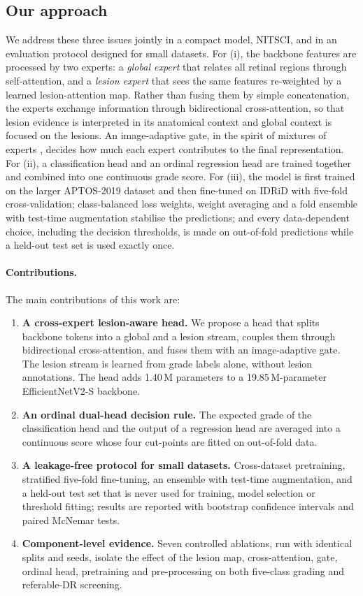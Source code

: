 \subsection*{Our approach}
We address these three issues jointly in a compact model, NITSCI, and in an evaluation protocol designed for small
datasets. For (i), the backbone features are processed by two experts: a \emph{global expert} that relates all
retinal regions through self-attention, and a \emph{lesion expert} that sees the same features re-weighted by a
learned lesion-attention map. Rather than fusing them by simple concatenation, the experts exchange information
through bidirectional cross-attention, so that lesion evidence is interpreted in its anatomical context and global
context is focused on the lesions. An image-adaptive gate, in the spirit of mixtures of experts
\citep{jacobs1991adaptive,shazeer2017outrageously}, decides how much each expert contributes to the final
representation. For (ii), a classification head and an ordinal regression head are trained together and combined
into one continuous grade score. For (iii), the model is first trained on the larger APTOS-2019 dataset
\citep{aptos2019} and then fine-tuned on IDRiD with five-fold cross-validation; class-balanced loss weights, weight
averaging and a fold ensemble with test-time augmentation stabilise the predictions; and every data-dependent choice,
including the decision thresholds, is made on out-of-fold predictions while a held-out test set is used exactly once.

\paragraph{Contributions.} The main contributions of this work are:
\begin{enumerate}
\item \textbf{A cross-expert lesion-aware head.} We propose a head that splits backbone tokens into a global and a
  lesion stream, couples them through bidirectional cross-attention, and fuses them with an image-adaptive gate. The
  lesion stream is learned from grade labels alone, without lesion annotations. The head adds 1.40\,M parameters to
  a 19.85\,M-parameter EfficientNetV2-S backbone.
\item \textbf{An ordinal dual-head decision rule.} The expected grade of the classification head and the output of a
  regression head are averaged into a continuous score whose four cut-points are fitted on out-of-fold data.
\item \textbf{A leakage-free protocol for small datasets.} Cross-dataset pretraining, stratified five-fold
  fine-tuning, an ensemble with test-time augmentation, and a held-out test set that is never used for training,
  model selection or threshold fitting; results are reported with bootstrap confidence intervals and paired McNemar
  tests.
\item \textbf{Component-level evidence.} Seven controlled ablations, run with identical splits and seeds, isolate the
  effect of the lesion map, cross-attention, gate, ordinal head, pretraining and pre-processing on both five-class
  grading and referable-DR screening.
\end{enumerate}

